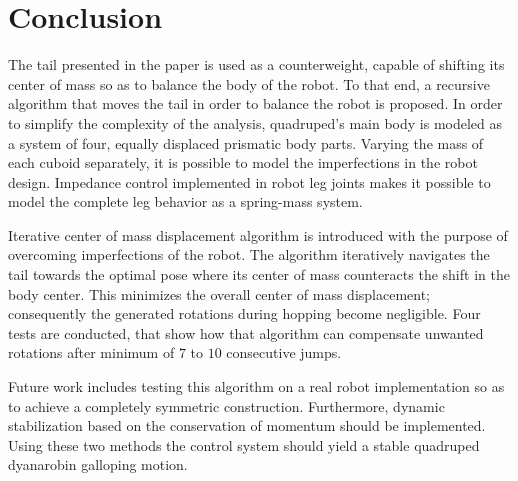 \section{Conclusion}\label{sec:conclusion}
 
The tail presented in the paper is used as a counterweight, capable of shifting its center of mass so as to balance the body of the robot. To that end, a recursive algorithm that moves the tail in order to balance the robot is proposed. In order to simplify the complexity of the analysis, quadruped's main body is modeled as a system of four, equally displaced prismatic body parts. Varying the mass of each cuboid separately, it is possible to model the imperfections in the robot design. Impedance control implemented in robot leg joints makes it possible to model the complete leg behavior as a spring-mass system.   

Iterative center of mass displacement algorithm is introduced with the purpose of overcoming imperfections of the robot. The algorithm iteratively navigates the tail towards the optimal pose where its center of mass counteracts the shift in the body center. This minimizes the overall center of mass displacement; consequently the generated rotations during hopping become negligible. Four tests are conducted, that show how that algorithm can compensate unwanted rotations after minimum of $7$ to $10$ consecutive jumps.

Future work includes testing this algorithm on a real robot implementation so as to achieve a completely symmetric construction. Furthermore, dynamic stabilization based on the conservation of momentum should be implemented. Using these two methods the control system should yield a stable quadruped dyanarobin galloping motion.
